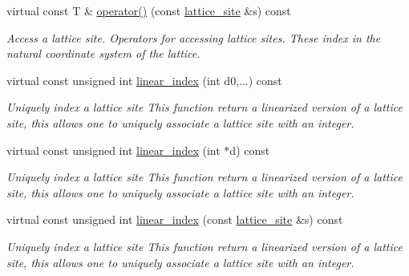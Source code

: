 \begin{DoxyCompactItemize}
virtual const T \& \hyperlink{classsisl_1_1cartesian__cubic_accef876590df812ec191ef66445fd6c7}{operator()} (const \hyperlink{namespacesisl_acd18feee4026583db6185df2b25434aa}{lattice\+\_\+site} \&s) const
\begin{DoxyCompactList}\small\item\em Access a lattice site. Operators for accessing lattice sites. These index in the natural coordinate system of the lattice. \end{DoxyCompactList}\item 
\mbox{\label{classsisl_1_1cartesian__cubic_a50f99d5a3725d7f5cc019700bda8e44d}} 
virtual const unsigned int \hyperlink{classsisl_1_1cartesian__cubic_a50f99d5a3725d7f5cc019700bda8e44d}{linear\+\_\+index} (int d0,...) const
\begin{DoxyCompactList}\small\item\em Uniquely index a lattice site This function return a linearized version of a lattice site, this allows one to uniquely associate a lattice site with an integer. \end{DoxyCompactList}\item 
\mbox{\label{classsisl_1_1cartesian__cubic_a42fc1105ab760fe34cb6863a79e7856b}} 
virtual const unsigned int \hyperlink{classsisl_1_1cartesian__cubic_a42fc1105ab760fe34cb6863a79e7856b}{linear\+\_\+index} (int $\ast$d) const
\begin{DoxyCompactList}\small\item\em Uniquely index a lattice site This function return a linearized version of a lattice site, this allows one to uniquely associate a lattice site with an integer. \end{DoxyCompactList}\item 
\mbox{\label{classsisl_1_1cartesian__cubic_a6029b29a29a5f6b056532c556ae883df}} 
virtual const unsigned int \hyperlink{classsisl_1_1cartesian__cubic_a6029b29a29a5f6b056532c556ae883df}{linear\+\_\+index} (const \hyperlink{namespacesisl_acd18feee4026583db6185df2b25434aa}{lattice\+\_\+site} \&s) const
\begin{DoxyCompactList}\small\item\em Uniquely index a lattice site This function return a linearized version of a lattice site, this allows one to uniquely associate a lattice site with an integer. \end{DoxyCompactList}\item 

\end{DoxyCompactItemize}
